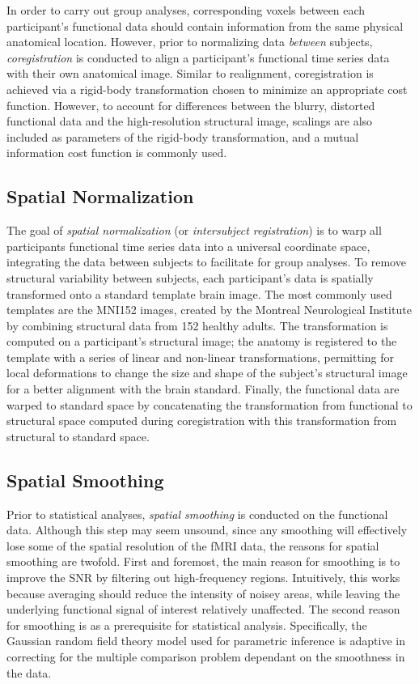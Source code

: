 In order to carry out group analyses, corresponding voxels between each participant's functional data should contain information from the same physical anatomical location. However, prior to normalizing data \textit{between} subjects, \textit{coregistration} is conducted to align a participant's functional time series data with their own anatomical image. Similar to realignment, coregistration is achieved via a rigid-body transformation chosen to minimize an appropriate cost function. However, to account for differences between the blurry, distorted functional data and the high-resolution structural image, scalings are also included as parameters of the rigid-body transformation, and a mutual information cost function is commonly used.    

\subsection{Spatial Normalization}

The goal of \textit{spatial normalization} (or \textit{intersubject registration}) is to warp all participants functional time series data into a universal coordinate space, integrating the data between subjects to facilitate for group analyses. To remove structural variability between subjects, each participant's data is spatially transformed onto a standard template brain image. The most commonly used templates are the MNI152 images, created by the Montreal Neurological Institute by combining structural data from 152 healthy adults. The transformation is computed on a participant's structural image; the anatomy is registered to the template with a series of linear and non-linear transformations, permitting for local deformations to change the size and shape of the subject's structural image for a better alignment with the brain standard. Finally, the functional data are warped to standard space by concatenating the transformation from functional to structural space computed during coregistration with this transformation from structural to standard space. 

\subsection{Spatial Smoothing}

Prior to statistical analyses, \textit{spatial smoothing} is conducted on the functional data. Although this step may seem unsound, since any smoothing will effectively lose some of the spatial resolution of the fMRI data, the reasons for spatial smoothing are twofold. First and foremost, the  main reason for smoothing is to improve the SNR by filtering out high-frequency regions. Intuitively, this works because averaging should reduce the intensity of noisey areas, while leaving the underlying functional signal of interest relatively unaffected. The second reason for smoothing is as a prerequisite for statistical analysis. Specifically, the Gaussian random field theory model used for parametric inference is adaptive in correcting for the multiple comparison problem dependant on the smoothness in the data.

